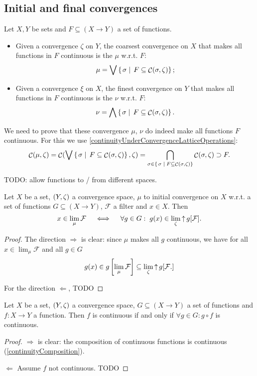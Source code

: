 \subsection{Initial and final convergences}
\begin{definition}
Let $X, Y$ be sets and $F\subseteq (X\to Y)$ a set of functions.
\begin{itemize}
\item Given a convergence $\zeta$ on $Y$, the coarsest convergence on $X$ that makes all functions in $F$ continuous is the  $\mu$ w.r.t. $F$:
\[ \mu = \bigvee \left\{\left. \sigma \;\right|\; F \subseteq \mathop{\mathcal{C}}(\sigma, \zeta) \right\}; \]
\item Given a convergence $\xi$ on $X$, the finest convergence on $Y$ that makes all functions in $F$ continuous is the  $\nu$ w.r.t. $F$:
\[ \nu = \bigwedge \left\{\left. \sigma \;\right|\; F \subseteq \mathop{\mathcal{C}}(\sigma, \zeta) \right\}. \]
\end{itemize}
\end{definition}

We need to prove that these convergence $\mu$, $\nu$ do indeed make all functions $F$ continuous. For this we use \ref{continuityUnderConvergenceLatticeOperations}:
\[ \mathop{\mathcal{C}}(\mu, \zeta) = \mathop{\mathcal{C}}(\bigvee \left\{\left. \sigma \;\right|\; F \subseteq \mathop{\mathcal{C}}(\sigma, \zeta) \right\}, \zeta) = \bigcap_{\sigma\in \left\{\left. \sigma \;\right|\; F \subseteq \mathop{\mathcal{C}}(\sigma, \zeta) \right\}}\mathop{\mathcal{C}}(\sigma, \zeta) \supset F. \]

TODO: allow functions to / from different spaces.

\begin{proposition}
Let $X$ be a set, $\left( Y, \zeta \right)$ a convergence space, $\mu$ to initial convergence on $X$ w.r.t. a set of functions $G\subseteq (X\to Y)$, $\mathcal{F}$ a filter and $x\in X$. Then
\[ x\in \lim_\mu \mathcal{F} \quad\iff\quad \forall g\in G: \; g(x) \in \lim_\zeta \mathop{\uparrow} g[\mathcal{F}]. \]
\end{proposition}
\begin{proof}
The direction $\Rightarrow$ is clear: since $\mu$ makes all $g$ continuous, we have for all $x\in \lim_\mu \mathcal{F}$ and all $g\in G$
\[ g(x) \in g\left[\lim_\mu \mathcal{F} \right] \subseteq \lim_\zeta \mathop{\uparrow} g[\mathcal{F}.] \]

For the direction $\Leftarrow$, TODO
\end{proof}
\begin{corollary}
Let $X$ be a set, $\left( Y, \zeta \right)$ a convergence space, $G\subseteq (X\to Y)$ a set of functions and $f:X\to Y$ a function. Then $f$ is continuous \textup{if and only if} $\forall g\in G: g\circ f$ is continuous.
\end{corollary}
\begin{proof}
$\Rightarrow$ is clear: the composition of continuous functions is continuous (\ref{continuityComposition}).

$\Leftarrow$ Assume $f$ not continuous. TODO
\end{proof}

